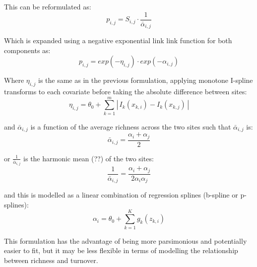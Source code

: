 \documentclass{article}
\begin{document}
This can be reformulated as:
\begin{equation}
    p_{i,j} = S_{i,j} \cdot \frac{1}{\bar{\alpha}_{i,j}}
\end{equation}

Which is expanded using a negative exponential link link function for both components as:
\begin{equation}
    p_{i,j} = exp(-\eta_{i,j}) \cdot exp(-\alpha_{i,j})
\end{equation}

Where $\eta_{i,j}$ is the same as in the previous formulation, applying monotone I-spline transforms to each covariate before taking the absolute difference between sites:
\begin{equation}
    \eta_{i,j} = \theta_{0} + \sum_{k=1}^{m}\left|\, I_k(x_{k,i}) - I_k(x_{k,j}) \,\right|
\end{equation}

and $\bar{\alpha}_{i,j}$ is a function of the average richness across the two sites such that $\bar{\alpha}_{i,j}$ is:
\begin{equation}
    \bar{\alpha}_{i,j} = \frac{\alpha_i + \alpha_j}{2}
\end{equation}

or $\frac{1}{\bar{\alpha}_{i,j}}$ is the harmonic mean (??) of the two sites:
\begin{equation}
    \frac{1}{\bar{\alpha}_{i,j}} = \frac{\alpha_{i} + \alpha_j}{2\alpha_{i}\alpha_{j}}
\end{equation} 

and this is modelled as a linear combination of regression splines (b-spline or p-splines):
\begin{equation}
    \alpha_{i} = \theta_{0} + \sum_{k=1}^{K}g_{k}(z_{k,i})
\end{equation}

This formulation has the advantage of being more parsimonious and potentially easier to fit, but it may be less flexible in terms of modelling the relationship between richness and turnover.
\end{document}
